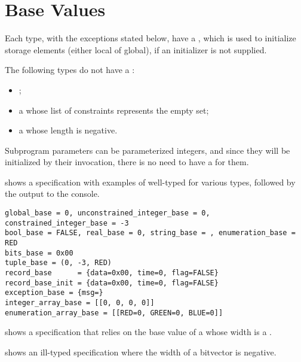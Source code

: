 \section{Base Values\label{sec:BaseValues}}
\hypertarget{def-basevalueterm}{}
Each type, with the exceptions stated below, have a \basevalueterm,
which is used to initialize storage elements (either local of global),
if an initializer is not supplied.

The following types do not have a \basevalueterm{}:
\begin{itemize}
    \item \parameterizedintegertypesterm{};
    \item a \wellconstrainedintegertypeterm{} whose list of constraints
        represents the empty set;
    \item a \bitvectortypeterm{} whose length is negative.
\end{itemize}

Subprogram parameters can be parameterized integers, and since they will be initialized by their
invocation, there is no need to have a \basevalueterm{} for them.

 shows a specification with examples of well-typed \basevalueterm{}
for various types, followed by the output to the console.
\begin{Verbatim}[fontsize=\footnotesize, frame=single]
global_base = 0, unconstrained_integer_base = 0, constrained_integer_base = -3
bool_base = FALSE, real_base = 0, string_base = , enumeration_base = RED
bits_base = 0x00
tuple_base = (0, -3, RED)
record_base      = {data=0x00, time=0, flag=FALSE}
record_base_init = {data=0x00, time=0, flag=FALSE}
exception_base = {msg=}
integer_array_base = [[0, 0, 0, 0]]
enumeration_array_base = [[RED=0, GREEN=0, BLUE=0]]
\end{Verbatim}

 shows a specification that relies on the base value of a \bitvectortypeterm{} whose width is a \parameterizedintegertypeterm{}.

 shows an ill-typed specification
where the width of a bitvector is negative.

